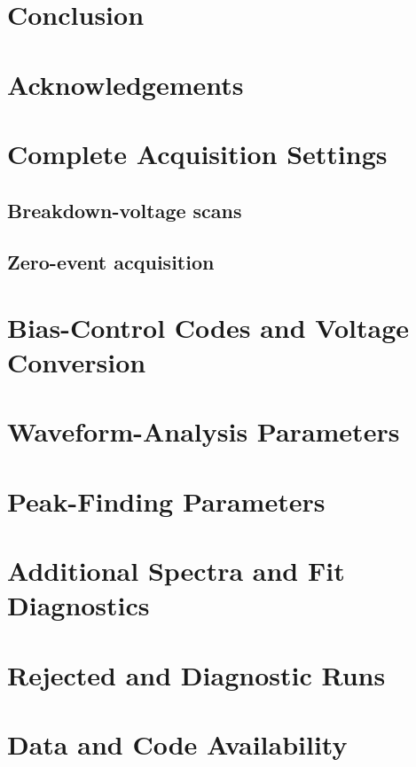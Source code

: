 \documentclass[11pt]{article}
\newcommand{\studysection}[1]{\section{#1}\leavevmode\par}
\newcommand{\studysubsection}[1]{\subsection{#1}\leavevmode\par}
\begin{document}
\studysection{Conclusion}

\section*{Acknowledgements}
\leavevmode\par
{}

\nocite{hamamatsu_s13360_series}



\appendix

\studysection{Complete Acquisition Settings}
\studysubsection{Breakdown-voltage scans}
\studysubsection{Zero-event acquisition}

\studysection{Bias-Control Codes and Voltage Conversion}

\studysection{Waveform-Analysis Parameters}

\studysection{Peak-Finding Parameters}

\studysection{Additional Spectra and Fit Diagnostics}

\studysection{Rejected and Diagnostic Runs}

\studysection{Data and Code Availability}
\end{document}
